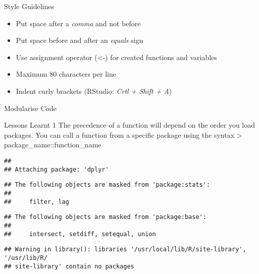 \documentclass[
  ignorenonframetext,
]{beamer}
\providecommand{\tightlist}{%
  \setlength{\itemsep}{0pt}\setlength{\parskip}{0pt}}
\begin{document}
\begin{frame}{Style Guidelines}
\protect\hypertarget{style-guidelines}{}
\begin{itemize}
\tightlist
\item
  Put space after a \emph{comma} and not before
\item
  Put space before and after an \emph{equals} sign
\item
  Use assignment operator (\textless-) for created functions and
  variables
\item
  Maximum 80 characters per line
\item
  Indent curly brackets (RStudio: \emph{Crtl + Shift + A})
\end{itemize}
\end{frame}

\begin{frame}{Modularise Code}
\protect\hypertarget{modularise-code}{}
\end{frame}

\begin{frame}[fragile]{Lessons Learnt 1}
\protect\hypertarget{lessons-learnt-1}{}
The precedence of a function will depend on the order you load packages.
You can call a function from a specific package using the syntax
\textgreater{} package\_name::function\_name

\begin{verbatim}
## 
## Attaching package: 'dplyr'
\end{verbatim}

\begin{verbatim}
## The following objects are masked from 'package:stats':
## 
##     filter, lag
\end{verbatim}

\begin{verbatim}
## The following objects are masked from 'package:base':
## 
##     intersect, setdiff, setequal, union
\end{verbatim}

\begin{verbatim}
## Warning in library(): libraries '/usr/local/lib/R/site-library', '/usr/lib/R/
## site-library' contain no packages
\end{verbatim}
\end{frame}
\end{document}
